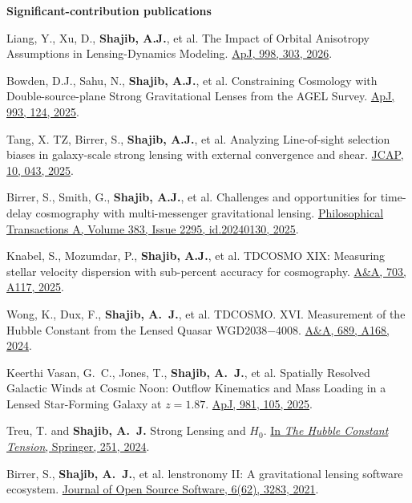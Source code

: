 \documentclass[margin, line]{res}
\begin{document}
\begin{resume}
\textbf{Significant-contribution publications}
\begin{etaremune}
	\item Liang, Y., Xu, D., \textbf{Shajib, A.J.}, et al. The Impact of Orbital Anisotropy Assumptions in Lensing-Dynamics Modeling. \href{https://ui.adsabs.harvard.edu/abs/2026ApJ...998..303L/abstract}{ApJ, 998, 303, 2026}.
	\item Bowden, D.J., Sahu, N., \textbf{Shajib, A.J.}, et al. Constraining Cosmology with Double-source-plane Strong Gravitational Lenses from the AGEL Survey. \href{https://ui.adsabs.harvard.edu/abs/2025ApJ...993..124B/abstract}{ApJ, 993, 124, 2025}.
	\item Tang, X. TZ{\mentee}, Birrer, S., \textbf{Shajib, A.J.}, et al. Analyzing Line-of-sight selection biases in galaxy-scale strong lensing with external convergence and shear. \href{https://ui.adsabs.harvard.edu/abs/2025JCAP...10..043T/abstract}{JCAP, 10, 043, 2025}.
	\item Birrer, S., Smith, G., \textbf{Shajib, A.J.}, et al. Challenges and opportunities for time-delay cosmography with multi-messenger gravitational lensing. \href{https://ui.adsabs.harvard.edu/abs/2025RSPTA.38340130B/abstract}{Philosophical Transactions A, Volume 383, Issue 2295, id.20240130, 2025}.
	\item Knabel, S., Mozumdar, P., \textbf{Shajib, A.J.}, et al. TDCOSMO XIX: Measuring stellar velocity dispersion with sub-percent accuracy for cosmography. \href{https://ui.adsabs.harvard.edu/abs/2025A\%26A...703A.117K/abstract}{A\&A, 703, A117, 2025}. 
	\item Wong, K., Dux, F., \textbf{Shajib, A.~J.}, et al. TDCOSMO. XVI. Measurement of the Hubble Constant from the Lensed Quasar WGD2038$-$4008. \href{https://ui.adsabs.harvard.edu/abs/2024A\%26A...689A.168W/abstract}{A\&A, 689, A168, 2024}.
	\item Keerthi Vasan, G.~C., Jones, T., \textbf{Shajib, A.~J.}, et al. Spatially Resolved Galactic Winds at Cosmic Noon: Outflow Kinematics and Mass Loading in a Lensed Star-Forming Galaxy at $z=1.87$. \href{https://ui.adsabs.harvard.edu/abs/2025ApJ...981..105V/abstract}{ApJ, 981, 105, 2025}.
	\item Treu, T. and \textbf{Shajib, A.~J.} Strong Lensing and $H_0$. \href{https://ui.adsabs.harvard.edu/abs/2024hct..book..251T/abstract}{In \textit{The Hubble Constant Tension}, Springer, 251, 2024}.
	\item Birrer, S., \textbf{Shajib, A.~J.}, et al. lenstronomy II: A gravitational lensing software ecosystem. \href{https://joss.theoj.org/papers/10.21105/joss.03283}{Journal of Open Source Software, 6(62), 3283, 2021}.

\end{etaremune}
\end{resume}
\end{document}
